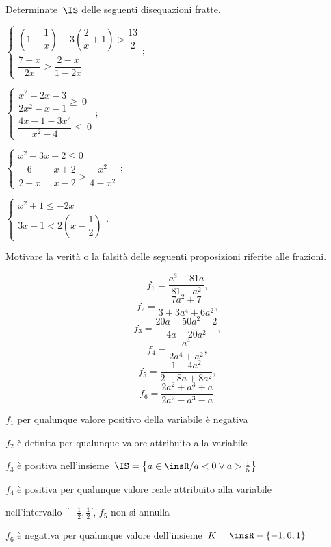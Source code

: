 \begin{esercizio}[\Ast]
\label{ese:21.68}
Determinate~$\IS$ delle seguenti disequazioni fratte.
\begin{multicols}{2}
\begin{enumeratea}{\longarray
 \item $\left\{\begin{array}{l}
  \left(1-\dfrac{1}{x}\right)+3\left(\dfrac{2}{x}+1\right)>\dfrac{13}{2}\\
  \dfrac{7+x}{2x}>\dfrac{2-x}{1-2x}
   \end{array}\right.;$
\item $\left\{\begin{array}{l}
  \dfrac{x^{2}-2x-3}{2x^{2}-x-1}\ge~0\\
  \dfrac{4x-1-3x^{2}}{x^{2}-4}\le~0
        \end{array}\right.;$
\item $\left\{\begin{array}{l}
  x^{2}-3x+2\le0\\
  \dfrac{6}{2+x}-\dfrac{x+2}{x-2}>\dfrac{x^{2}}{4-x^{2}}
        \end{array}\right.;$
\item $\left\{\begin{array}{l}
  x^{2}+1\le -2x\\
  3x-1<2\left(x-\dfrac{1}{2}\right)
  \end{array}\right..$}
\end{enumeratea}
\end{multicols}
\end{esercizio}

\begin{esercizio}
\label{ese:21.69}
Motivare la verità o la falsità delle seguenti
proposizioni riferite alle frazioni.
\begin{multicols}{3}
\noindent\[f_{1}=\frac{a^{3}-81a}{81-a^{2}},\]
\[f_{2}=\frac{7a^{2}+7}{3+3a^{4}+6a^{2}},\]
\[f_{3}=\frac{20a-50a^{2}-2}{4a-20a^{2}},\]
\[f_{4}=\frac{a^{4}}{2a^{4}+a^{2}},\]
\[f_{5}=\frac{1-4a^{2}}{2-8a+8a^{2}},\]
\[f_{6}=\frac{2a^{2}+a^{3}+a}{2a^{2}-a^{3}-a}.\]
\end{multicols}
\begin{enumeratea}
\TabPositions{11cm}
\item $f_{1}$ per qualunque valore positivo della variabile è negativa \tab\boxV\quad\boxF
\item $f_{2}$ è definita per qualunque valore attribuito alla variabile \tab\boxV\quad\boxF
\item $f_{3}$ è positiva nell'insieme~$\IS=\left\{a\in \insR/a<0\vee a>\frac{1}{5}\right\}$ \tab\boxV\quad\boxF
\item $f_{4}$ è positiva per qualunque valore reale attribuito alla variabile \tab\boxV\quad\boxF
\item nell'intervallo~${[}-\frac{1}{2},\frac{1}{2}{[}$, $f_{5}$ non si annulla \tab\boxV\quad\boxF
\item $f_{6}$ è negativa per qualunque valore dell'insieme~$K=\insR-\{-1,0,1\}$ \tab\boxV\quad\boxF
\end{enumeratea}
\end{esercizio}

